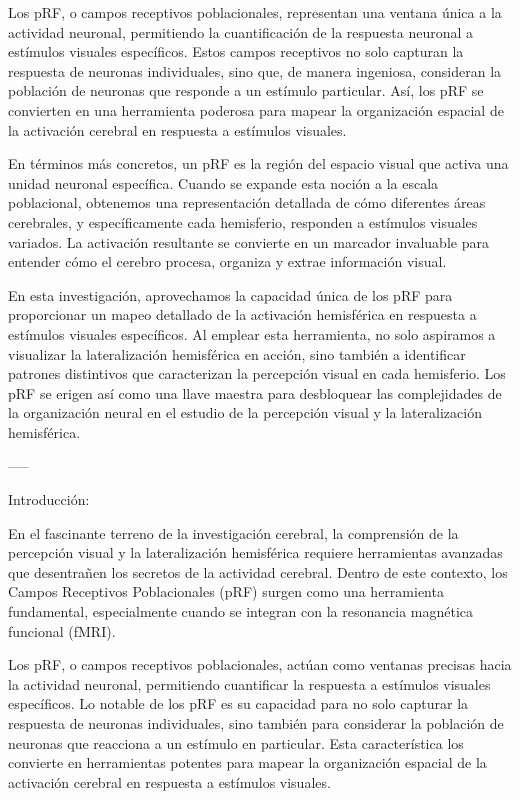 \documentclass[12pt,oneside]{uhthesis}
\begin{document}
Los pRF, o campos receptivos poblacionales, representan una ventana única a la actividad neuronal, permitiendo la cuantificación de la respuesta neuronal a estímulos visuales específicos. Estos campos receptivos no solo capturan la respuesta de neuronas individuales, sino que, de manera ingeniosa, consideran la población de neuronas que responde a un estímulo particular. Así, los pRF se convierten en una herramienta poderosa para mapear la organización espacial de la activación cerebral en respuesta a estímulos visuales.

En términos más concretos, un pRF es la región del espacio visual que activa una unidad neuronal específica. Cuando se expande esta noción a la escala poblacional, obtenemos una representación detallada de cómo diferentes áreas cerebrales, y específicamente cada hemisferio, responden a estímulos visuales variados. La activación resultante se convierte en un marcador invaluable para entender cómo el cerebro procesa, organiza y extrae información visual.

En esta investigación, aprovechamos la capacidad única de los pRF para proporcionar un mapeo detallado de la activación hemisférica en respuesta a estímulos visuales específicos. Al emplear esta herramienta, no solo aspiramos a visualizar la lateralización hemisférica en acción, sino también a identificar patrones distintivos que caracterizan la percepción visual en cada hemisferio. Los pRF se erigen así como una llave maestra para desbloquear las complejidades de la organización neural en el estudio de la percepción visual y la lateralización hemisférica.

-----

Introducción:

En el fascinante terreno de la investigación cerebral, la comprensión de la percepción visual y la lateralización hemisférica requiere herramientas avanzadas que desentrañen los secretos de la actividad cerebral. Dentro de este contexto, los Campos Receptivos Poblacionales (pRF) surgen como una herramienta fundamental, especialmente cuando se integran con la resonancia magnética funcional (fMRI).

Los pRF, o campos receptivos poblacionales, actúan como ventanas precisas hacia la actividad neuronal, permitiendo cuantificar la respuesta a estímulos visuales específicos. Lo notable de los pRF es su capacidad para no solo capturar la respuesta de neuronas individuales, sino también para considerar la población de neuronas que reacciona a un estímulo en particular. Esta característica los convierte en herramientas potentes para mapear la organización espacial de la activación cerebral en respuesta a estímulos visuales.
\end{document}
